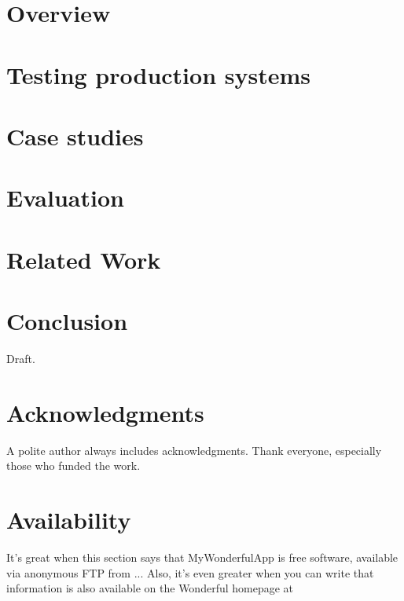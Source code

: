 \documentclass[letterpaper,twocolumn,10pt]{article}
\begin{document}


\section{Overview}
\label{sec:overview}



\section{Testing production systems}
\label{sec:method}



\section{Case studies}
\label{sec:cases}



\section{Evaluation}
\label{sec:eval}



\section{Related Work}
\label{sec:rw}



\section{Conclusion}
\label{sec:concl}

Draft.

\section{Acknowledgments}

A polite author always includes acknowledgments.  Thank everyone,
especially those who funded the work. 

\section{Availability}

It's great when this section says that MyWonderfulApp is free software, 
available via anonymous FTP from ... Also, it's even greater when you can
write that information is also  available on the Wonderful homepage at

{\footnotesize 
}
\end{document}
